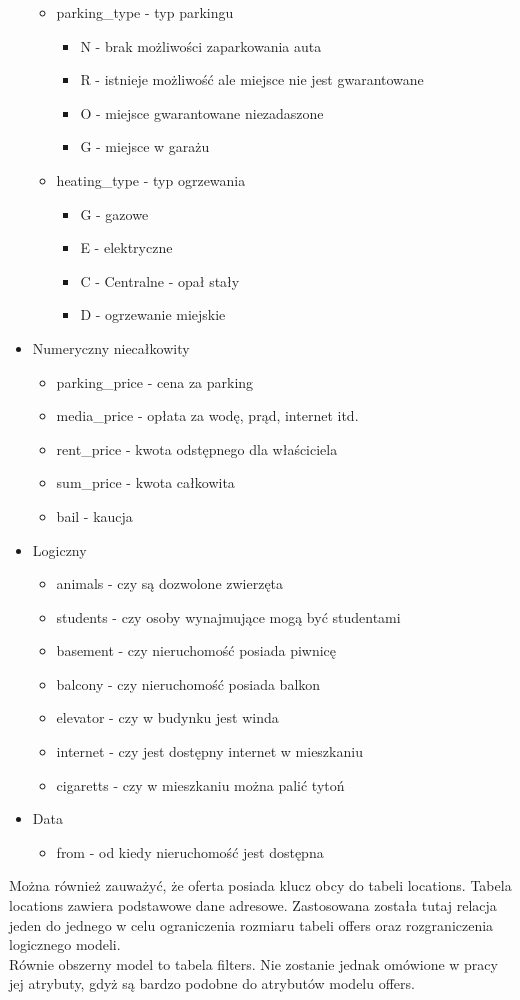 \begin{itemize}
\begin{itemize}
\item parking\_type - typ parkingu
\begin{itemize}
\item N - brak możliwości zaparkowania auta
\item R - istnieje możliwość ale miejsce nie jest gwarantowane
\item O - miejsce gwarantowane niezadaszone
\item G - miejsce w garażu
\end{itemize} 
\item heating\_type - typ ogrzewania
\begin{itemize}
\item G - gazowe
\item E - elektryczne
\item C - Centralne - opał stały
\item D - ogrzewanie miejskie
\end{itemize}
\end{itemize}
\item Numeryczny niecałkowity
\begin{itemize}
\item parking\_price - cena za parking
\item media\_price - opłata za wodę, prąd, internet itd.
\item rent\_price - kwota odstępnego dla właściciela 
\item sum\_price - kwota całkowita
\item bail - kaucja
\end{itemize}
\item Logiczny
\begin{itemize}
\item animals - czy są dozwolone zwierzęta
\item students - czy osoby wynajmujące mogą być studentami
\item basement - czy nieruchomość posiada piwnicę
\item balcony - czy nieruchomość posiada balkon
\item elevator - czy w budynku jest winda
\item internet - czy jest dostępny internet w mieszkaniu
\item cigaretts - czy w mieszkaniu można palić tytoń
\end{itemize}
\item Data
\begin{itemize}
\item from - od kiedy nieruchomość jest dostępna
\end{itemize}
\end{itemize} 
Można również zauważyć, że oferta posiada klucz obcy do tabeli locations. Tabela locations zawiera podstawowe dane adresowe. Zastosowana została tutaj relacja jeden do jednego w celu ograniczenia rozmiaru tabeli offers oraz rozgraniczenia logicznego modeli.\\
Równie obszerny model to tabela filters. Nie zostanie jednak omówione w pracy jej atrybuty, gdyż są bardzo podobne do atrybutów modelu offers.
